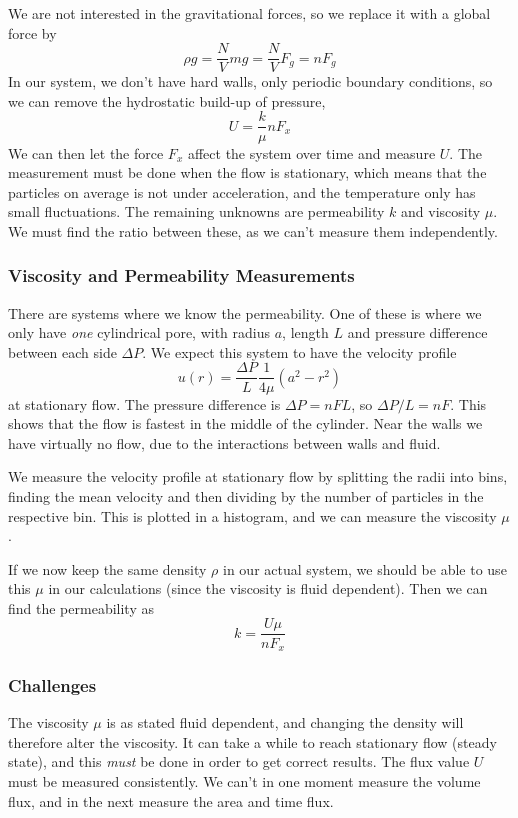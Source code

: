 \documentclass[11pt]{article}
\numberwithin{equation}{section}
\numberwithin{figure}{section}
\newcommand{\ita}[1]{\textit{#1}}
\begin{document}
We are not interested in the gravitational forces,
so we replace it with a global force by
\begin{equation}
    \rho g = \frac{N}{V} mg = \frac{N}{V} F_g = n F_g
\end{equation}
In our system, we don't have hard walls, only periodic
boundary conditions, so we can remove the hydrostatic build-up of pressure,
\begin{equation}
    U = \frac{k}{\mu}n F_x
\end{equation}
We can then let the force $F_x$ affect the system over time and measure
$U$. The measurement must be done when the flow is stationary, 
which means that the particles on average is not under acceleration,
and the temperature only has small fluctuations.
The remaining unknowns are permeability $k$ and viscosity $\mu$.
We must find the ratio between these, as we can't measure them independently.

\subsubsection{Viscosity and Permeability Measurements}
There are systems where we know the permeability. One
of these is where we only have \ita{one} cylindrical pore,
with radius $a$, length $L$ and pressure difference between each side
$\Delta P$.
We expect this system to have the velocity profile
\begin{equation}
    u(r) = \frac{\Delta P}{L} \frac{1}{4\mu}(a^2 - r^2)
\end{equation}
at stationary flow. The pressure difference is 
$\Delta P = n F L$, so $\Delta P/L = nF$.
This shows that the flow is fastest in the middle of the cylinder.
Near the walls we have virtually no flow, due to the interactions
between walls and fluid.

We measure the velocity profile at stationary flow by splitting 
the radii into bins, finding the mean
velocity and then dividing by the number of particles in the respective bin.
This is plotted in a histogram, and we can measure the
viscosity $\mu$.

If we now keep the same density $\rho$ in our actual system,
we should be able to use this $\mu$ in our calculations
(since the viscosity is fluid dependent).
Then we can find the permeability as
\begin{equation}
    k = \frac{U\mu}{n F_x}
\end{equation}

\subsubsection{Challenges}
The viscosity $\mu$ is as stated fluid dependent, and changing the
density will therefore alter the viscosity.
It can take a while to reach stationary flow (steady state),
and this \ita{must} be done in order to get correct results.
The flux value $U$ must be measured consistently.
We can't in one moment measure the volume flux, and in the next
measure the area and time flux.
\end{document}
